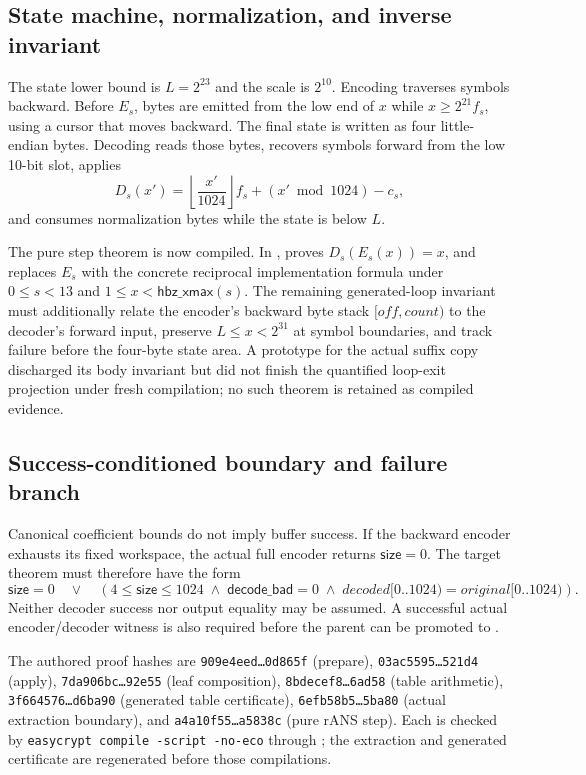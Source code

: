 \subsection*{State machine, normalization, and inverse invariant}

The state lower bound is $L=2^{23}$ and the scale is $2^{10}$.  Encoding
traverses symbols backward.  Before $E_s$, bytes are emitted from the low end
of $x$ while $x\geq 2^{21}f_s$, using a cursor that moves backward.  The
final state is written as four little-endian bytes.  Decoding reads those
bytes, recovers symbols forward from the low 10-bit slot, applies
\[
 D_s(x')=\left\lfloor\frac{x'}{1024}\right\rfloor f_s
          +(x'\bmod1024)-c_s,
\]
and consumes normalization bytes while the state is below $L$.

The pure step theorem is now compiled.  In
,  proves
$D_s(E_s(x))=x$, and  replaces
$E_s$ with the concrete reciprocal implementation formula under
$0\leq s<13$ and $1\leq x<\mathsf{hbz\_xmax}(s)$.
The remaining generated-loop invariant must additionally relate the
encoder's backward byte stack $[off,count)$ to the decoder's forward input,
preserve $L\leq x<2^{31}$ at symbol boundaries, and track failure before the
four-byte state area.  A prototype for the actual suffix copy discharged its
body invariant but did not finish the quantified loop-exit projection under
fresh compilation; no such theorem is retained as compiled evidence.

\subsection*{Success-conditioned boundary and failure branch}

Canonical coefficient bounds do not imply buffer success.  If the backward
encoder exhausts its fixed workspace, the actual full encoder returns
$\mathsf{size}=0$.  The target theorem must therefore have the form
\[
 \mathsf{size}=0\quad\lor\quad
 \left(4\leq\mathsf{size}\leq1024\;\land\;
       \mathsf{decode\_bad}=0\;\land\;
       decoded[0..1024)=original[0..1024)\right).
\]
Neither decoder success nor output equality may be assumed.  A successful
actual encoder/decoder witness is also required before the parent can be
promoted to .

The authored proof hashes are
\texttt{909e4eed\ldots0d865f} (prepare),
\texttt{03ac5595\ldots521d4} (apply),
\texttt{7da906bc\ldots92e55} (leaf composition),
\texttt{8bdecef8\ldots6ad58} (table arithmetic),
\texttt{3f664576\ldots{}d6ba90} (generated table certificate),
\texttt{6efb58b5\ldots5ba80} (actual extraction boundary), and
\texttt{a4a10f55\ldots{}a5838c} (pure rANS step).  Each is checked by
\texttt{easycrypt compile -script -no-eco} through
; the extraction and generated certificate are
regenerated before those compilations.

